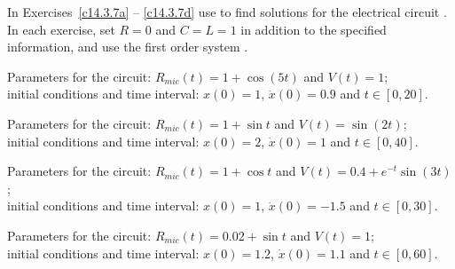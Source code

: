 \documentclass{ximera}
\begin{document}
\CEXER

\noindent In Exercises~\ref{c14.3.7a} -- \ref{c14.3.7d} use \Matlab
to find solutions for the electrical circuit 
.  In each exercise, set $R=0$ and $C=L=1$ in addition to 
the specified information, and use the first order system .

\begin{exercise} \label{c14.3.7a}
Parameters for the circuit: $R_{mic}(t) = 1+\cos(5t)$ and $V(t) = 1$;\\
initial conditions and time interval: $x(0) = 1$, $\dot{x}(0) = 0.9$ and  
$t\in[0,20]$.
\end{exercise}

\begin{exercise} \label{c14.3.7b}
Parameters for the circuit: $R_{mic}(t) = 1+\sin t$ and $V(t) = \sin(2t)$;\\
initial conditions and time interval: $x(0) = 2$, $\dot{x}(0) = 1$ and $t\in[0,40]$.
\end{exercise}

\begin{exercise} \label{c14.3.7c}
Parameters for the circuit: $R_{mic}(t) = 1+\cos t$ and $V(t) = 0.4+e^{-t}\sin(3t)$;\\
initial conditions and time interval: $x(0) = 1$, $\dot{x}(0) = -1.5$ and 
$t\in[0,30]$.
\end{exercise}

\begin{exercise} \label{c14.3.7d}
Parameters for the circuit: $R_{mic}(t) = 0.02+\sin t$ and $V(t) = 1$;\\
initial conditions and time interval: $x(0) = 1.2$, $\dot{x}(0) = 1.1$ and 
$t\in[0,60]$.
\end{exercise}
\end{document}
